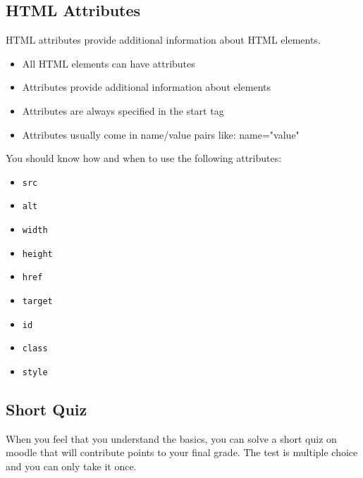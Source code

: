 \documentclass[english,11pt,a4paper]{report}
\begin{document}
\subsection{HTML Attributes}
HTML attributes provide additional information about HTML elements.

\begin{itemize}
	\item All HTML elements can have attributes
    \item Attributes provide additional information about elements
    \item Attributes are always specified in the start tag
    \item Attributes usually come in name/value pairs like: name="value"
\end{itemize}

You should know how and when to use the following attributes:
\begin{itemize}
    \item \verb|src|
    \item \verb|alt|
    \item \verb|width|
    \item \verb|height|
    \item \verb|href|
    \item \verb|target|
    \item \verb|id|
    \item \verb|class|
    \item \verb|style|
\end{itemize}

\subsection{Short Quiz}
When you feel that you understand the basics, you can solve a short quiz on moodle that will contribute points to your final grade. The test is multiple choice and you can only take it once. 
\end{document}
